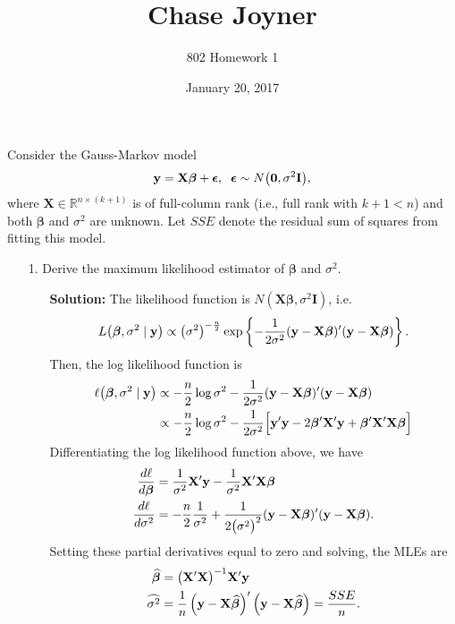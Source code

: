 \documentclass[11pt]{article}
\title{Chase Joyner}
\author{802 Homework 1}
\date{January 20, 2017}
\newcommand{\R}{{\mathbb R}}
\begin{document}
\maketitle
\noindent Consider the Gauss-Markov model
\[
\mathbf{y} = \mathbf{X}\bm\beta + \bm\epsilon, \hspace{2mm}\bm\epsilon\sim N\big{(}\mathbf{0},\sigma^2\mathbf{I}\big{)},
\]
where $\mathbf{X}\in \R^{n\times(k+1)}$ is of full-column rank (i.e., full rank with $k+1<n$) and both $\bm\beta$ and $\sigma^2$ are unknown.  Let $SSE$ denote the residual sum of squares from fitting this model.
\begin{itemize}
\item[1.] Derive the maximum likelihood estimator of $\bm\beta$ and $\sigma^2$.
\begin{itemize}
\item[] \textbf{Solution:}  The likelihood function is $N(\mathbf{X}\bm\beta,\sigma^2\mathbf{I})$, i.e.
\[
L\big{(}\bm\beta,\sigma^2\mid \mathbf{y}\big{)} \propto \big{(}\sigma^2\big{)}^{-\frac{n}{2}}\exp\left\{-\frac{1}{2\sigma^2}(\mathbf{y} - \mathbf{X}\bm\beta)'(\mathbf{y} - \mathbf{X}\bm\beta)\right\}.
\]
Then, the log likelihood function is 
\begin{align*}
\ell\big{(}\bm\beta,\sigma^2\mid\mathbf{y}\big{)} &\propto -\frac{n}{2}\log\sigma^2 - \frac{1}{2\sigma^2}(\mathbf{y} - \mathbf{X}\bm\beta)'(\mathbf{y} - \mathbf{X}\bm\beta) \\
&\propto -\frac{n}{2}\log\sigma^2 - \frac{1}{2\sigma^2}\Big{[}\mathbf{y}'\mathbf{y} - 2\bm\beta'\mathbf{X}'\mathbf{y} + \bm\beta'\mathbf{X}'\mathbf{X}\bm\beta\Big{]}
\end{align*}
Differentiating the log likelihood function above, we have
\begin{align*}
\frac{d\ell}{d\bm\beta} &= \frac{1}{\sigma^2}\mathbf{X}'\mathbf{y} - \frac{1}{\sigma^2}\mathbf{X}'\mathbf{X}\bm\beta \\
\frac{d\ell}{d\sigma^2} &= -\frac{n}{2}\frac{1}{\sigma^2} + \frac{1}{2\big{(}\sigma^2\big{)}^2}(\mathbf{y} - \mathbf{X}\bm\beta)'(\mathbf{y} - \mathbf{X}\bm\beta).
\end{align*}
Setting these partial derivatives equal to zero and solving, the MLEs are
\begin{align*}
\widehat{\bm\beta} &= \big{(}\mathbf{X}'\mathbf{X}\big{)}^{-1}\mathbf{X}'\mathbf{y} \\
\widehat{\sigma^2} &= \frac{1}{n}\left(\mathbf{y}-\mathbf{X}\widehat{\bm\beta}\right)'\left(\mathbf{y}-\mathbf{X}\widehat{\bm\beta}\right) = \frac{SSE}{n}.
\end{align*}
\end{itemize}


\end{itemize}
\end{document}
